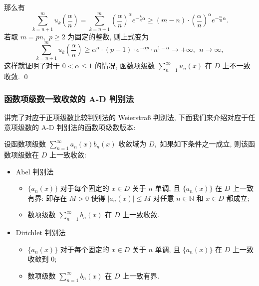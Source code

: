 \begin{frame}
那么有
\[
\sum_{k=n+1}^m u_k\left(\frac{\alpha}{n}\right) = \sum_{k=n+1}^m \left( \frac{\alpha}{n} \right)^\alpha e^{-\frac{k}{n} \alpha} \geqslant (m-n) \cdot \left( \frac{\alpha}{n} \right)^\alpha e^{-\frac{m}{n} \alpha}.
\]
若取 $m = pn,$ $p \geqslant 2$ 为固定的整数, 则上式变为
\[
\sum_{k=n+1}^m u_k\left(\frac{\alpha}{n}\right) \geqslant \alpha^\alpha \cdot (p-1) \cdot e^{-\alpha p} \cdot n^{1-\alpha} \to +\infty, ~~ n \to \infty,
\]
这样就证明了对于 $0 < \alpha \leqslant 1$ 的情况, 函数项级数 $\displaystyle \sum_{n=1}^\infty u_n(x)$ 在 $D$ 上不一致收敛.
\qed

\end{frame}


\begin{frame}
\frametitle{函数项级数一致收敛的 A-D 判别法}

讲完了对应于正项级数比较判别法的 Weierstraß 判别法, 下面我们来介绍对应于任意项级数的 A-D 判别法的函数项级数版本:
\pause
\begin{thm}[A-D 判别法]
设函数项级数 $\displaystyle \sum_{n=1}^\infty a_n(x)b_n(x)$ 收敛域为 $D,$ 如果如下条件之一成立, 则该函数项级数在 $D$ 上一致收敛:
\begin{itemize}
\item Abel 判别法
\begin{itemize}
\item[$1^\circ$] $\{a_n(x)\}$ 对于每个固定的 $x \in D$ 关于 $n$ 单调, 且 $\{a_n(x)\}$ 在 $D$ 上一致有界: 即存在 $M > 0$ 使得 $|a_n(x)| \leqslant M$ 对任意 $n \in \mathbb{N}$ 和 $x \in D$ 都成立;
\item[$2^\circ$] 数项级数 $\displaystyle \sum_{n=1}^\infty b_n(x)$ 在 $D$ 上一致收敛.
\end{itemize}
\item Dirichlet 判别法
\begin{itemize}
\item[$1^\circ$] $\{a_n(x)\}$ 对于每个固定的 $x \in D$ 关于 $n$ 单调, 且 $\{a_n(x)\}$ 在 $D$ 上一致收敛到 $0;$
\item[$2^\circ$] 数项级数 $\displaystyle \sum_{n=1}^\infty b_n(x)$ 在 $D$ 上一致有界.
\end{itemize}
\end{itemize}
\end{thm}

\end{frame}


